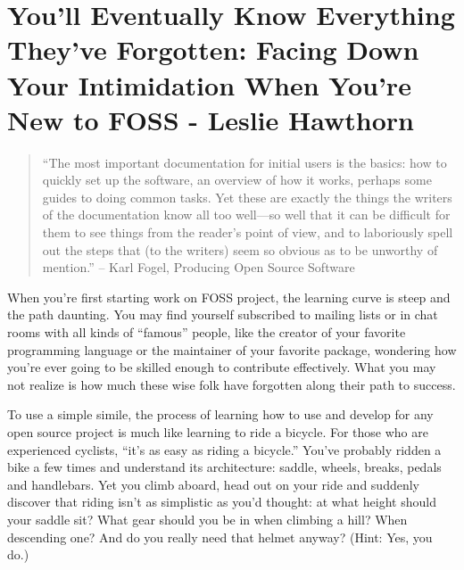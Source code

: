 \section{You’ll Eventually Know Everything They’ve Forgotten: Facing Down Your Intimidation When You’re New to FOSS - Leslie Hawthorn}
\begin{quote}
``The most important documentation for initial users is the basics: how to quickly set up the software, an overview of how it works, perhaps some guides to doing common tasks. Yet these are exactly the things the writers of the documentation know all too well—so well that it can be difficult for them to see things from the reader's point of view, and to laboriously spell out the steps that (to the writers) seem so obvious as to be unworthy of mention.'' -- Karl Fogel, Producing Open Source Software                                                                                                                                                                                                                                                                                                                                                                                                                                                                                                                       \end{quote}

When you’re first starting work on FOSS project, the learning curve is steep and the path daunting. You may find yourself subscribed to mailing lists or in chat rooms with all kinds of “famous” people, like the creator of your favorite programming language or the maintainer of your favorite package, wondering how you’re ever going to be skilled enough to contribute effectively. What you may not realize is how much these wise folk have forgotten along their path to success.

To use a simple simile, the process of learning how to use and develop for any open source project is much like learning to ride a bicycle. For those who are experienced cyclists, “it’s as easy as riding a bicycle.” You’ve probably ridden a bike a few times and understand its architecture: saddle, wheels, breaks, pedals and handlebars. Yet you climb aboard, head out on your ride and suddenly discover that riding isn’t as simplistic as you’d thought: at what height should your saddle sit? What gear should you be in when climbing a hill? When descending one? And do you really need that helmet anyway? (Hint: Yes, you do.) 

